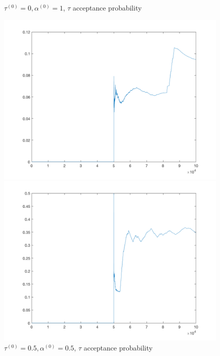 \documentclass{siamart1116}
\begin{document}
\begin{figure}[!htb]
    \begin{minipage}{0.48\textwidth}
        \centering
        \caption{$\tau^{(0)} = 0, \alpha^{(0)} = 1$, $\tau$ acceptance probability}
        \includegraphics[width=\linewidth]{zero_one_tau_prob.png}
    \end{minipage} \hfill
    \begin{minipage}{0.48\textwidth}
        \centering
        \caption{$\tau^{(0)} = 0.5, \alpha^{(0)} = 0.5$, $\tau$ acceptance probability}
        \includegraphics[width=\linewidth]{half_half_tau_prob.png}
    \end{minipage}
\end{figure}
\end{document}
